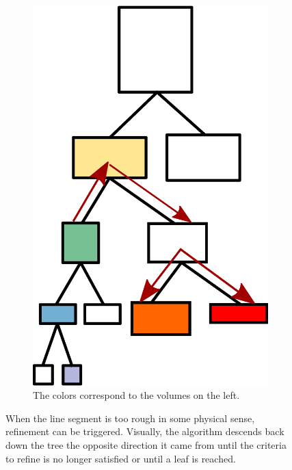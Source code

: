 \begin{figure}
\begin{subfigure}[h]{0.45\textwidth}
                \includegraphics[width=\textwidth]{graphics/refine_memory.eps}
                \caption{The colors correspond to the volumes on the left.}
                \label{fig:refinememory}
        \end{subfigure}
        \caption[Refinement during the absorption algorithm.]{When the line segment is too rough in some physical sense, refinement can be triggered. Visually, the algorithm descends back down the tree the opposite direction it came from until the criteria to refine is no longer satisfied or until a leaf is reached.}\label{fig:refining}
\end{figure}

